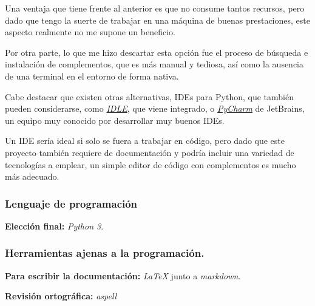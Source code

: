 Una ventaja que tiene frente al anterior es que no consume tantos recursos, pero dado que tengo la suerte de trabajar en una máquina de buenas prestaciones, este aspecto realmente no me supone un beneficio.

Por otra parte, lo que me hizo descartar esta opción fue el proceso de búsqueda e instalación de complementos, que es más manual y tediosa, así como la ausencia de una terminal en el entorno de forma nativa.

Cabe destacar que existen otras alternativas, IDEs para Python, que también pueden considerarse, como \href{https://docs.python.org/3/library/idle.html}{\textit{IDLE}}, que viene integrado, o \href{https://www.jetbrains.com/es-es/pycharm/}{\textit{PyCharm}} de JetBrains, un equipo muy conocido por desarrollar muy buenos IDEs.

Un IDE sería ideal si solo se fuera a trabajar en código, pero dado que este proyecto también requiere de documentación y podría incluir una variedad de tecnologías a emplear, un simple editor de código con complementos es mucho más adecuado.

\subsubsection{Lenguaje de programación}

\textbf{Elección final:} \textit{Python 3}.

\subsubsection{Herramientas ajenas a la programación.}

\textbf{Para escribir la documentación:} \textit{LaTeX} junto a \textit{markdown}.

\textbf{Revisión ortográfica:} \textit{aspell}